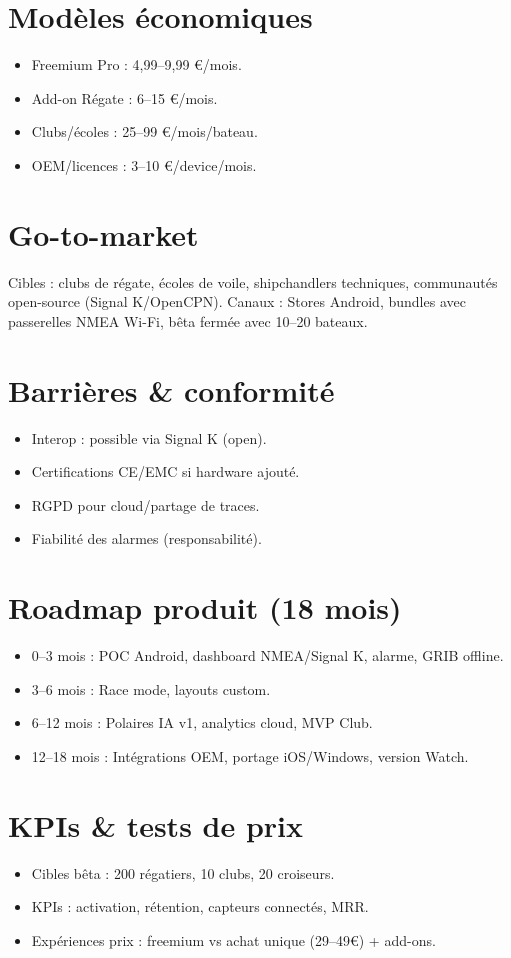 \documentclass[12pt,a4paper]{article}
\begin{document}
\section{Modèles économiques}
\begin{itemize}
  \item Freemium \textrightarrow Pro : 4,99--9,99 €/mois.
  \item Add-on Régate : 6--15 €/mois.
  \item Clubs/écoles : 25--99 €/mois/bateau.
  \item OEM/licences : 3--10 €/device/mois.
\end{itemize}

\section{Go-to-market}
Cibles : clubs de régate, écoles de voile, shipchandlers techniques, communautés open-source (Signal K/OpenCPN).  
Canaux : Stores Android, bundles avec passerelles NMEA Wi-Fi, bêta fermée avec 10--20 bateaux.

\section{Barrières \& conformité}
\begin{itemize}
  \item Interop : possible via Signal K (open).
  \item Certifications CE/EMC si hardware ajouté.
  \item RGPD pour cloud/partage de traces.
  \item Fiabilité des alarmes (responsabilité).
\end{itemize}

\section{Roadmap produit (18 mois)}
\begin{itemize}
  \item 0--3 mois : POC Android, dashboard NMEA/Signal K, alarme, GRIB offline.
  \item 3--6 mois : Race mode, layouts custom.
  \item 6--12 mois : Polaires IA v1, analytics cloud, MVP Club.
  \item 12--18 mois : Intégrations OEM, portage iOS/Windows, version Watch.
\end{itemize}

\section{KPIs \& tests de prix}
\begin{itemize}
  \item Cibles bêta : 200 régatiers, 10 clubs, 20 croiseurs.
  \item KPIs : activation, rétention, capteurs connectés, MRR.
  \item Expériences prix : freemium vs achat unique (29--49€) + add-ons.
\end{itemize}
\end{document}

